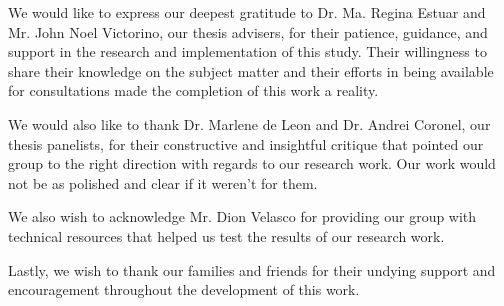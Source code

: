 \begin{acknowledgments}
We would like to express our deepest gratitude to Dr. Ma. Regina Estuar and Mr. John Noel Victorino, our thesis advisers, for their patience, guidance, and support in the research and implementation of this study. Their willingness to share their knowledge on the subject matter and their efforts in being available for consultations made the completion of this work a reality. 

We would also like to thank Dr. Marlene de Leon and Dr. Andrei Coronel, our thesis panelists, for their constructive and insightful critique that pointed our group to the right direction with regards to our research work. Our work would not be as polished and clear if it weren't for them.

We also wish to acknowledge Mr. Dion Velasco for providing our group with technical resources that helped us test the results of our research work.

Lastly, we wish to thank our families and friends for their undying support and encouragement throughout the development of this work.
\end{acknowledgments}